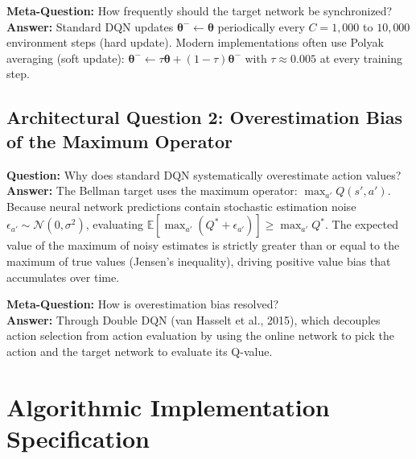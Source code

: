 \documentclass[11pt,a4paper]{article}
\theoremstyle{definition}
\begin{document}
\textbf{Meta-Question:} How frequently should the target network be synchronized?\\
\textbf{Answer:} Standard DQN updates $\boldsymbol{\theta}^- \gets \boldsymbol{\theta}$ periodically every $C = 1,000$ to $10,000$ environment steps (hard update). Modern implementations often use Polyak averaging (soft update): $\boldsymbol{\theta}^- \gets \tau \boldsymbol{\theta} + (1 - \tau) \boldsymbol{\theta}^-$ with $\tau \approx 0.005$ at every training step.

\subsection{Architectural Question 2: Overestimation Bias of the Maximum Operator}
\textbf{Question:} Why does standard DQN systematically overestimate action values?\\
\textbf{Answer:} The Bellman target uses the maximum operator: $\max_{a'} Q(s', a')$. Because neural network predictions contain stochastic estimation noise $\epsilon_{a'} \sim \mathcal{N}(0, \sigma^2)$, evaluating $\mathbb{E}[\max_{a'} (Q^* + \epsilon_{a'})] \ge \max_{a'} Q^*$. The expected value of the maximum of noisy estimates is strictly greater than or equal to the maximum of true values (Jensen's inequality), driving positive value bias that accumulates over time.

\textbf{Meta-Question:} How is overestimation bias resolved?\\
\textbf{Answer:} Through Double DQN (van Hasselt et al., 2015), which decouples action selection from action evaluation by using the online network to pick the action and the target network to evaluate its Q-value.

\section{Algorithmic Implementation Specification}
\end{document}
